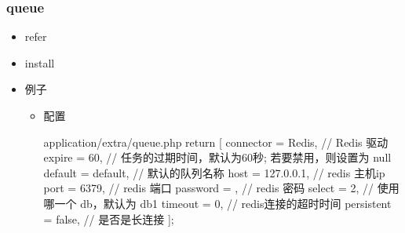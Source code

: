 \documentclass[a4paper,10pt,english]{sphinxmanual}
\begin{document}
\subsubsection{queue}
\label{\detokenize{program/php:queue}}\begin{itemize}
\item {} 
refer

\begin{sphinxVerbatim}[commandchars=\\\{\}]
\end{sphinxVerbatim}

\item {} 
install

\begin{sphinxVerbatim}[commandchars=\\\{\}]
  
\end{sphinxVerbatim}

\item {} 
例子
\begin{itemize}
\item {} 
配置

\begin{sphinxVerbatim}[commandchars=\\\{\}]
application/extra/queue.php
return [
        \PYGZsq{}connector\PYGZsq{}  =\PYGZgt{} \PYGZsq{}Redis\PYGZsq{},         // Redis 驱动
        \PYGZsq{}expire\PYGZsq{}     =\PYGZgt{} 60,             // 任务的过期时间，默认为60秒; 若要禁用，则设置为 null
        \PYGZsq{}default\PYGZsq{}    =\PYGZgt{} \PYGZsq{}default\PYGZsq{},      // 默认的队列名称
        \PYGZsq{}host\PYGZsq{}       =\PYGZgt{} \PYGZsq{}127.0.0.1\PYGZsq{},        // redis 主机ip
        \PYGZsq{}port\PYGZsq{}       =\PYGZgt{} 6379,           // redis 端口
        \PYGZsq{}password\PYGZsq{}   =\PYGZgt{} \PYGZsq{}\PYGZsq{},             // redis 密码
        \PYGZsq{}select\PYGZsq{}     =\PYGZgt{} 2,                  // 使用哪一个 db，默认为 db1
        \PYGZsq{}timeout\PYGZsq{}    =\PYGZgt{} 0,              // redis连接的超时时间
        \PYGZsq{}persistent\PYGZsq{} =\PYGZgt{} false,          // 是否是长连接
];
\end{sphinxVerbatim}


\end{itemize}
\end{itemize}
\end{document}
